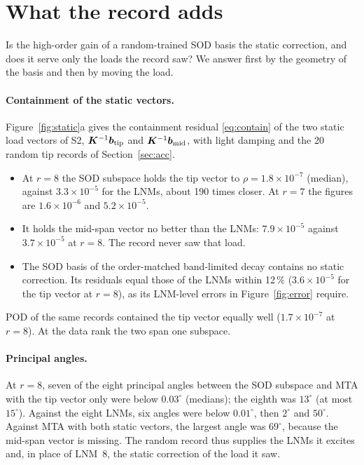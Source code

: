 \documentclass[preprint,12pt]{elsarticle}
\begin{document}
\section{What the record adds}\label{sec:adds}
Is the high-order gain of a random-trained SOD basis the static correction, and does it serve only the loads the record saw?
We answer first by the geometry of the basis and then by moving the load.

\paragraph{Containment of the static vectors.} Figure~\ref{fig:static}a gives the containment residual \eqref{eq:contain} of the two static load vectors of S2, $\bm{K}^{-1}\bm{b}_{\mathrm{tip}}$ and $\bm{K}^{-1}\bm{b}_{\mathrm{mid}}$, with light damping and the 20 random tip records of Section~\ref{sec:acc}.
\begin{itemize}
\item At $r=8$ the SOD subspace holds the tip vector to $\rho=1.8\times10^{-7}$ (median), against $3.3\times10^{-5}$ for the LNMs, about 190 times closer. At $r=7$ the figures are $1.6\times10^{-6}$ and $5.2\times10^{-5}$.
\item It holds the mid-span vector no better than the LNMs: $7.9\times10^{-5}$ against $3.7\times10^{-5}$ at $r=8$. The record never saw that load.
\item The SOD basis of the order-matched band-limited decay contains no static correction. Its residuals equal those of the LNMs within 12\,\% ($3.6\times10^{-5}$ for the tip vector at $r=8$), as its LNM-level errors in Figure~\ref{fig:error} require.
\end{itemize}
POD of the same records contained the tip vector equally well ($1.7\times10^{-7}$ at $r=8$). At the data rank the two span one subspace.

\paragraph{Principal angles.} At $r=8$, seven of the eight principal angles between the SOD subspace and MTA with the tip vector only were below $0.03^\circ$ (medians); the eighth was $13^\circ$ (at most $15^\circ$). Against the eight LNMs, six angles were below $0.01^\circ$, then $2^\circ$ and $50^\circ$. Against MTA with both static vectors, the largest angle was $69^\circ$, because the mid-span vector is missing.
The random record thus supplies the LNMs it excites and, in place of LNM~8, the static correction of the load it saw.
\end{document}
